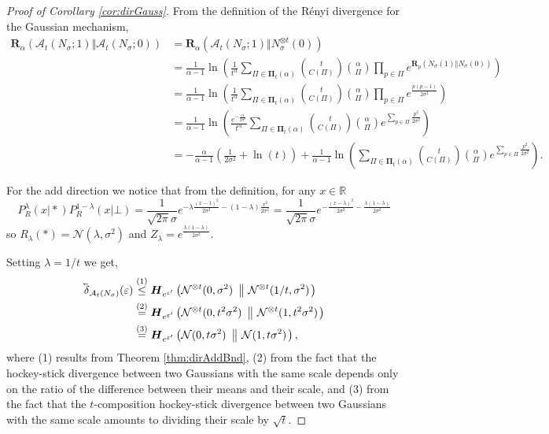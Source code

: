 \documentclass{article}
\theoremstyle{plain}
\theoremstyle{definition}
\newcommand{\eps}{\varepsilon}
\newcommand{\reals}{\mathbb{R}}
\newcommand{\eqExp}[2]{\overset{(#1)}{#2}}
\newcommand{\lvec}[1]{\reflectbox{$\vec{\reflectbox{$#1$}}$}}
\newcommand{\rand}{R}
\newcommand{\Renyi}[1]{\boldsymbol{R}_{#1}}
\newcommand{\RenyiDiv}[3]{\Renyi{#1}\left(#2 \Vert #3 \right)}
\newcommand{\HockeyStick}[1]{\boldsymbol{H}_{#1}}
\newcommand{\HockeyStickDiv}[3]{\HockeyStick{#1}\left(#2 ~\left\Vert~ #3 \right. \right)}
\newcommand{\alloc}[2]{\mathcal{A}_{#1}\left(#2\right)}
\newcommand{\allocFunc}[3]{\mathcal{A}_{#1}\left(#2; #3\right)}
\newcommand{\add}[1]{\lvec{#1}}
\newcommand{\privProfAdd}[1]{\add{\delta}_{#1}}
\begin{document}
\begin{proof}[Proof of Corollary \ref{cor:dirGauss}]
    From the definition of the R\'{e}nyi divergence for the Gaussian mechanism, 
    \begin{align*}
        \Renyi{\alpha} \left(\allocFunc{t}{N_{\sigma}}{1} \Vert \allocFunc{t}{N_{\sigma}}{0} \right) & = \Renyi{\alpha} \left(\allocFunc{t}{N_{\sigma}}{1} \Vert N^{\otimes t}_{\sigma}(0) \right)
        \\ & = \frac{1}{\alpha - 1}\ln \left(\frac{1}{t^{\alpha}} \sum_{\Pi \in \boldsymbol{\Pi}_{t}(\alpha)} \binom{t}{C(\Pi)} \binom{\alpha}{\Pi} \prod_{p \in \Pi} e^{\RenyiDiv{p}{N_{\sigma}(1)}{N_{\sigma}(0)}} \right)
        \\ & = \frac{1}{\alpha - 1}\ln \left(\frac{1}{t^{\alpha}} \sum_{\Pi \in \boldsymbol{\Pi}_{t}(\alpha)} \binom{t}{C(\Pi)} \binom{\alpha}{\Pi} \prod_{p \in \Pi} e^{\frac{p (p-1)}{2 \sigma^{2}}} \right)
        \\ & = \frac{1}{\alpha - 1}\ln \left(\frac{e^{ - \frac{\alpha}{2 \sigma^{2}}}}{t^{\alpha}} \sum_{\Pi \in \boldsymbol{\Pi}_{t}(\alpha)} \binom{t}{C(\Pi)} \binom{\alpha}{\Pi} e^{\sum_{p \in \Pi}\frac{p^{2}}{2 \sigma^{2}}} \right)
        \\ & = -\frac{\alpha}{\alpha - 1} \left(\frac{1}{2 \sigma^{2}} + \ln \left(t\right) \right) + \frac{1}{\alpha - 1}\ln \left(\sum_{\Pi \in \boldsymbol{\Pi}_{t}(\alpha)} \binom{t}{C(\Pi)} \binom{\alpha}{\Pi} e^{\sum_{p \in \Pi}\frac{p^{2}}{2 \sigma^{2}}} \right).
    \end{align*}

    For the add direction we notice that from the definition, for any $x \in \reals$
    \[
        P^{\lambda}_{\rand}(x \vert *) P_{\rand}^{1-\lambda}(x \vert \bot) = \frac{1}{\sqrt{2 \pi} \sigma} e^{-\lambda \frac{(x - 1)^{2}}{2 \sigma^{2}} - (1-\lambda) \frac{x^{2}}{2 \sigma^{2}}} = \frac{1}{\sqrt{2 \pi} \sigma} e^{-\frac{(x-\lambda)^{2}}{2 \sigma^{2}} - \frac{\lambda (1-\lambda)}{2 \sigma^{2}}}
    \]
    so $\rand_{\lambda}(*) = \mathcal{N}(\lambda, \sigma^{2})$ and $Z_{\lambda} = e^{\frac{\lambda (1-\lambda)}{2 \sigma^{2}}}$.

    Setting $\lambda = 1/t$ we get,
    \begin{align*}
        \privProfAdd{\alloc{t}{N_{\sigma}}}(\eps) & \eqExp{1}{\le} \HockeyStickDiv{e^{\eps'}}{\mathcal{N}^{\otimes t}(0, \sigma^{2})}{\mathcal{N}^{\otimes t}(1/t, \sigma^{2})} 
        \\ & \eqExp{2}{=} \HockeyStickDiv{e^{\eps'}}{\mathcal{N}^{\otimes t}(0, t^{2} \sigma^{2})}{\mathcal{N}^{\otimes t}(1, t^{2} \sigma^{2})}
        \\ & \eqExp{3}{=} \HockeyStickDiv{e^{\eps'}}{\mathcal{N}(0, t \sigma^{2})}{\mathcal{N}(1, t \sigma^{2})},
    \end{align*}
    where (1) results from Theorem \ref{thm:dirAddBnd}, (2) from the fact that the hockey-stick divergence between two Gaussians with the same scale depends only on the ratio of the difference between their means and their scale, and (3) from the fact that the $t$-composition hockey-stick divergence between two Gaussians with the same scale amounts to dividing their scale by $\sqrt{t}$.
\end{proof}
\end{document}
